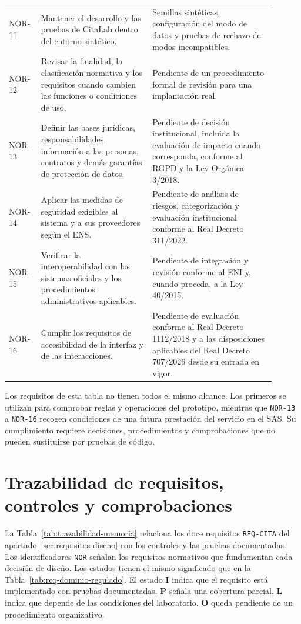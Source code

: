\begin{longtable}{L{0.10\linewidth}L{0.38\linewidth}L{0.42\linewidth}}
NOR-11 & Mantener el desarrollo y las pruebas de CitaLab dentro del entorno sintético. & Semillas sintéticas, configuración del modo de datos y pruebas de rechazo de modos incompatibles. \\
NOR-12 & Revisar la finalidad, la clasificación normativa y los requisitos cuando cambien las funciones o condiciones de uso. & Pendiente de un procedimiento formal de revisión para una implantación real. \\
NOR-13 & Definir las bases jurídicas, responsabilidades, información a las personas, contratos y demás garantías de protección de datos. & Pendiente de decisión institucional, incluida la evaluación de impacto cuando corresponda, conforme al RGPD y la Ley Orgánica 3/2018. \\
NOR-14 & Aplicar las medidas de seguridad exigibles al sistema y a sus proveedores según el ENS. & Pendiente de análisis de riesgos, categorización y evaluación institucional conforme al Real Decreto 311/2022. \\
NOR-15 & Verificar la interoperabilidad con los sistemas oficiales y los procedimientos administrativos aplicables. & Pendiente de integración y revisión conforme al ENI y, cuando proceda, a la Ley 40/2015. \\
NOR-16 & Cumplir los requisitos de accesibilidad de la interfaz y de las interacciones. & Pendiente de evaluación conforme al Real Decreto 1112/2018 y a las disposiciones aplicables del Real Decreto 707/2026 desde su entrada en vigor. \\
\bottomrule
\end{longtable}
\normalsize
\setlength{\tabcolsep}{6pt}

Los requisitos de esta tabla no tienen todos el mismo alcance. Los primeros se utilizan para comprobar reglas y operaciones del prototipo, mientras que \texttt{NOR-13} a \texttt{NOR-16} recogen condiciones de una futura prestación del servicio en el SAS. Su cumplimiento requiere decisiones, procedimientos y comprobaciones que no pueden sustituirse por pruebas de código.

\section{Trazabilidad de requisitos, controles y comprobaciones}

La Tabla~\ref{tab:trazabilidad-memoria} relaciona los doce requisitos \texttt{REQ-CITA} del apartado~\ref{sec:requisitos-diseno} con los controles y las pruebas documentadas. Los identificadores \texttt{NOR} señalan los requisitos normativos que fundamentan cada decisión de diseño. Los estados tienen el mismo significado que en la Tabla~\ref{tab:req-dominio-regulado}. El estado \textbf{I} indica que el requisito está implementado con pruebas documentadas. \textbf{P} señala una cobertura parcial. \textbf{L} indica que depende de las condiciones del laboratorio. \textbf{O} queda pendiente de un procedimiento organizativo.

